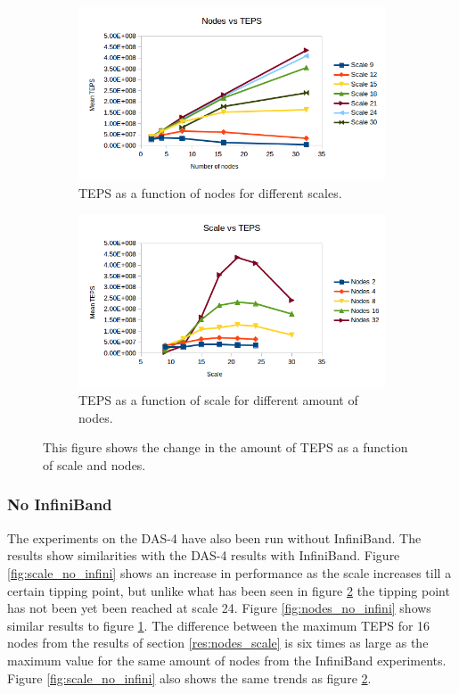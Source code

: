 \begin{figure}[!h]
\centering
\begin{subfigure}{.5\textwidth}
  \centering
  \includegraphics[width=\linewidth]{images/nodes_no_val.png}
  \caption{TEPS as a function of nodes for different scales.}
  \label{fig:nodes_no_val}
\end{subfigure}%
\begin{subfigure}{.5\textwidth}
  \centering
  \includegraphics[width=\linewidth]{images/scale_no_val.png}
  \caption{TEPS as a function of scale for different amount of nodes.}
  \label{fig:scale_no_val}
\end{subfigure}
\caption{This figure shows the change in the amount of TEPS as a function of scale and nodes.}
\label{fig:das_no_val}
\end{figure}

\subsubsection{No InfiniBand}
The experiments on the DAS-4 have also been run without InfiniBand. The results show similarities with the DAS-4 results with InfiniBand. Figure \ref{fig:scale_no_infini} shows an increase in performance as the scale increases till a certain tipping point, but unlike what has been seen in figure \ref{fig:scale_no_val} the tipping point has not been yet been reached at scale 24.
 Figure \ref{fig:nodes_no_infini} shows similar results to figure \ref{fig:nodes_no_val}. The difference between the maximum TEPS for 16 nodes from the results of section \ref{res:nodes_scale} is six times as large as the maximum value for the same amount of nodes from the InfiniBand experiments.
Figure \ref{fig:scale_no_infini} also shows the same trends as figure \ref{fig:scale_no_val}. 
 
